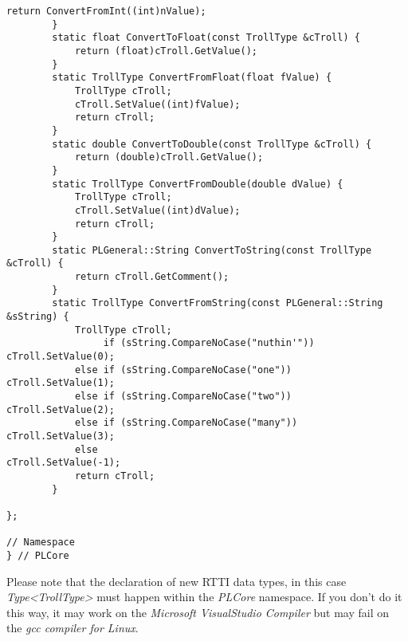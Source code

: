 \begin{lstlisting}[label=Code:UserDefinedRTTIDataTypeInline,caption={Inline of the user defined RTTI data type}]
			return ConvertFromInt((int)nValue);
		}
		static float ConvertToFloat(const TrollType &cTroll) {
			return (float)cTroll.GetValue();
		}
		static TrollType ConvertFromFloat(float fValue) {
			TrollType cTroll;
			cTroll.SetValue((int)fValue);
			return cTroll;
		}
		static double ConvertToDouble(const TrollType &cTroll) {
			return (double)cTroll.GetValue();
		}
		static TrollType ConvertFromDouble(double dValue) {
			TrollType cTroll;
			cTroll.SetValue((int)dValue);
			return cTroll;
		}
		static PLGeneral::String ConvertToString(const TrollType &cTroll) {
			return cTroll.GetComment();
		}
		static TrollType ConvertFromString(const PLGeneral::String &sString) {
			TrollType cTroll;
				 if (sString.CompareNoCase("nuthin'"))	cTroll.SetValue(0);
			else if (sString.CompareNoCase("one"))		cTroll.SetValue(1);
			else if (sString.CompareNoCase("two"))		cTroll.SetValue(2);
			else if (sString.CompareNoCase("many"))		cTroll.SetValue(3);
			else										cTroll.SetValue(-1);
			return cTroll;
		}

};

// Namespace
} // PLCore
\end{lstlisting}
Please note that the declaration of new RTTI data types, in this case \emph{Type<TrollType>} must happen within the \emph{PLCore} namespace. If you don't do it this way, it may work on the \emph{Microsoft VisualStudio Compiler} but may fail on the \emph{gcc compiler for Linux}.


